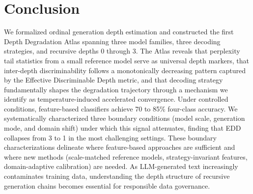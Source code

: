 \documentclass[11pt,a4paper]{article}
\begin{document}
\section{Conclusion}
\label{sec:conclusion}

We formalized ordinal generation depth estimation and constructed the first Depth Degradation Atlas spanning three model families, three decoding strategies, and recursive depths 0 through 3.
The Atlas reveals that perplexity tail statistics from a small reference model serve as universal depth markers, that inter-depth discriminability follows a monotonically decreasing pattern captured by the Effective Discriminable Depth metric, and that decoding strategy fundamentally shapes the degradation trajectory through a mechanism we identify as temperature-induced accelerated convergence.
Under controlled conditions, feature-based classifiers achieve 70 to 85\% four-class accuracy.
We systematically characterized three boundary conditions (model scale, generation mode, and domain shift) under which this signal attenuates, finding that EDD collapses from 3 to 1 in the most challenging settings.
These boundary characterizations delineate where feature-based approaches are sufficient and where new methods (scale-matched reference models, strategy-invariant features, domain-adaptive calibration) are needed.
As LLM-generated text increasingly contaminates training data, understanding the depth structure of recursive generation chains becomes essential for responsible data governance.


\end{document}
